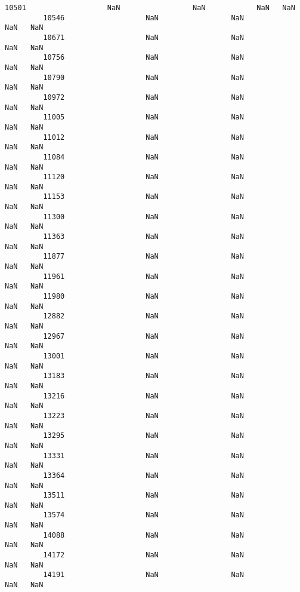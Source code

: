 \documentclass[11pt]{article}
\begin{document}
\begin{Verbatim}[commandchars=\\\{\}]
         10501                   NaN                 NaN            NaN   NaN   
         10546                   NaN                 NaN            NaN   NaN   
         10671                   NaN                 NaN            NaN   NaN   
         10756                   NaN                 NaN            NaN   NaN   
         10790                   NaN                 NaN            NaN   NaN   
         10972                   NaN                 NaN            NaN   NaN   
         11005                   NaN                 NaN            NaN   NaN   
         11012                   NaN                 NaN            NaN   NaN   
         11084                   NaN                 NaN            NaN   NaN   
         11120                   NaN                 NaN            NaN   NaN   
         11153                   NaN                 NaN            NaN   NaN   
         11300                   NaN                 NaN            NaN   NaN   
         11363                   NaN                 NaN            NaN   NaN   
         11877                   NaN                 NaN            NaN   NaN   
         11961                   NaN                 NaN            NaN   NaN   
         11980                   NaN                 NaN            NaN   NaN   
         12882                   NaN                 NaN            NaN   NaN   
         12967                   NaN                 NaN            NaN   NaN   
         13001                   NaN                 NaN            NaN   NaN   
         13183                   NaN                 NaN            NaN   NaN   
         13216                   NaN                 NaN            NaN   NaN   
         13223                   NaN                 NaN            NaN   NaN   
         13295                   NaN                 NaN            NaN   NaN   
         13331                   NaN                 NaN            NaN   NaN   
         13364                   NaN                 NaN            NaN   NaN   
         13511                   NaN                 NaN            NaN   NaN   
         13574                   NaN                 NaN            NaN   NaN   
         14088                   NaN                 NaN            NaN   NaN   
         14172                   NaN                 NaN            NaN   NaN   
         14191                   NaN                 NaN            NaN   NaN   
         

\end{Verbatim}
\end{document}

